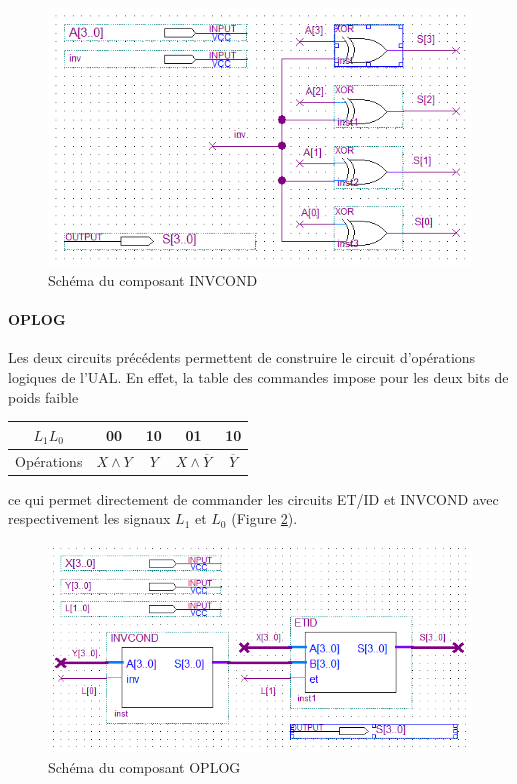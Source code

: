 \documentclass[a4paper,11pt]{article}
\begin{document}
\begin{figure}[h]
	\center
	\includegraphics[scale=0.75]{invcond.png}
	\caption{Schéma du composant INVCOND}
	\label{invcond}
\end{figure}

\paragraph{OPLOG} Les deux circuits précédents permettent de construire le circuit d'opérations logiques de l'UAL. En effet, la table des commandes impose pour les deux bits de poids faible
\begin{table}[h]\centering
\begin{tabular}{c|c|c|c|c}
	$L_1L_0$ & 00 & 10 & 01 & 10 \\ \hline
	Opérations & $X\wedge Y$ & $Y$ & $X\wedge \overline{Y}$ & $\overline{Y}$ \\
\end{tabular}\end{table}
ce qui permet directement de commander les circuits ET/ID et INVCOND avec respectivement les signaux $L_1$ et $L_0$ (Figure \ref{oplog}).

\begin{figure}[h]
	\center
	\includegraphics[scale=0.75]{oplog.png}
	\caption{Schéma du composant OPLOG}
	\label{oplog}
\end{figure}
\end{document}
